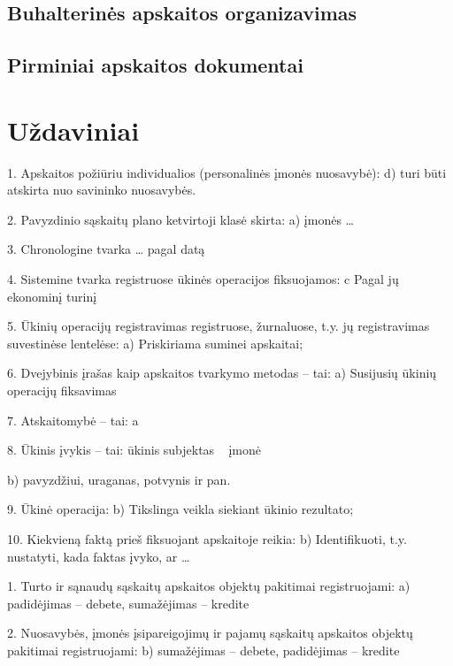 \section{Buhalterinės apskaitos organizavimas}



\section{Pirminiai apskaitos dokumentai}



\chapter{Uždaviniai}


1. Apskaitos požiūriu individualios (personalinės įmonės nuosavybė):
d) turi būti atskirta nuo savininko nuosavybės.

2. Pavyzdinio sąskaitų plano ketvirtoji klasė skirta:
a) įmonės …

3. Chronologine tvarka …
pagal datą

4. Sistemine tvarka registruose ūkinės operacijos fiksuojamos:
c Pagal jų ekonominį turinį

5. Ūkinių operacijų registravimas registruose, žurnaluose, t.y. jų
registravimas suvestinėse lentelėse:
a) Priskiriama suminei apskaitai;

6. Dvejybinis įrašas kaip apskaitos tvarkymo metodas – tai:
a) Susijusių ūkinių operacijų fiksavimas

7. Atskaitomybė – tai:
a

8. Ūkinis įvykis – tai:
ūkinis subjektas ~ įmonė

b) pavyzdžiui, uraganas, potvynis ir pan.

9. Ūkinė operacija:
b) Tikslinga veikla siekiant ūkinio rezultato;

10. Kiekvieną faktą prieš fiksuojant apskaitoje reikia:
b) Identifikuoti, t.y. nustatyti, kada faktas įvyko, ar …


1. Turto ir sąnaudų sąskaitų apskaitos objektų pakitimai registruojami:
a) padidėjimas – debete, sumažėjimas – kredite

2. Nuosavybės, įmonės įsipareigojimų ir pajamų sąskaitų apskaitos objektų
pakitimai registruojami:
b) sumažėjimas – debete, padidėjimas – kredite

